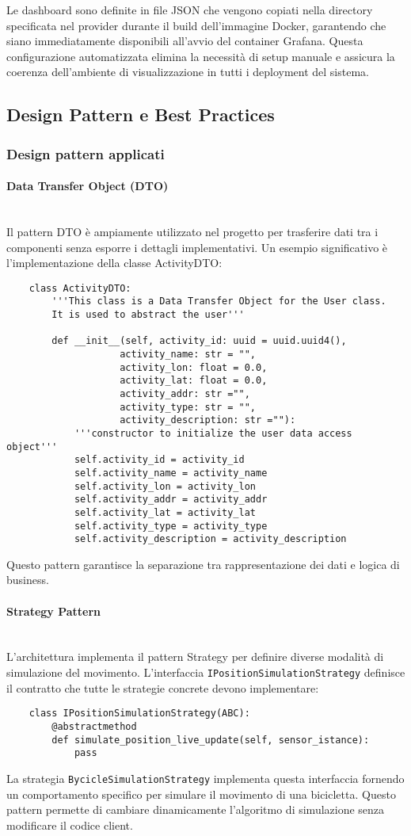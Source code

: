 \documentclass[10pt]{article}
\newcommand{\myparagraph}[1]{\paragraph{#1}\mbox{}\\}
\begin{document}
        Le dashboard sono definite in file JSON che vengono copiati nella directory specificata nel provider durante il build dell'immagine Docker, garantendo che siano immediatamente disponibili all'avvio del container Grafana. Questa configurazione automatizzata elimina la necessità di setup manuale e assicura la coerenza dell'ambiente di visualizzazione in tutti i deployment del sistema.

\subsection{Design Pattern e Best Practices}
\subsubsection{Design pattern applicati}
    \myparagraph{Data Transfer Object (DTO)}
    Il pattern DTO è ampiamente utilizzato nel progetto per trasferire dati tra i componenti senza esporre i dettagli implementativi. Un esempio significativo è l'implementazione della classe ActivityDTO:
    \begin{lstlisting}
    class ActivityDTO:
        '''This class is a Data Transfer Object for the User class. 
        It is used to abstract the user'''

        def __init__(self, activity_id: uuid = uuid.uuid4(), 
                    activity_name: str = "",
                    activity_lon: float = 0.0, 
                    activity_lat: float = 0.0, 
                    activity_addr: str ="", 
                    activity_type: str = "", 
                    activity_description: str =""):
            '''constructor to initialize the user data access object'''
            self.activity_id = activity_id
            self.activity_name = activity_name
            self.activity_lon = activity_lon
            self.activity_addr = activity_addr
            self.activity_lat = activity_lat
            self.activity_type = activity_type
            self.activity_description = activity_description
    \end{lstlisting}
    Questo pattern garantisce la separazione tra rappresentazione dei dati e logica di business.

    \myparagraph{Strategy Pattern}
    L'architettura implementa il pattern Strategy per definire diverse modalità di simulazione del movimento. L'interfaccia \texttt{IPositionSimulationStrategy} definisce il contratto che tutte le strategie concrete devono implementare:
    \begin{lstlisting}
    class IPositionSimulationStrategy(ABC):
        @abstractmethod
        def simulate_position_live_update(self, sensor_istance):
            pass
    \end{lstlisting}
    La strategia \texttt{BycicleSimulationStrategy} implementa questa interfaccia fornendo un comportamento specifico per simulare il movimento di una bicicletta. Questo pattern permette di cambiare dinamicamente l'algoritmo di simulazione senza modificare il codice client.
\end{document}
